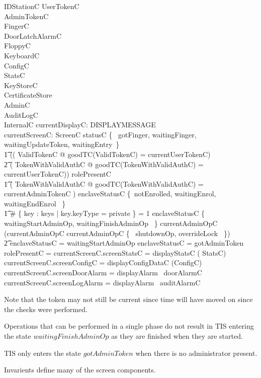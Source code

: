 \begin{schema}{IDStationC}
	UserTokenC
\\	AdminTokenC
\\	FingerC
\\	DoorLatchAlarmC
\\      FloppyC
\\      KeyboardC
\\      ConfigC
\\      StatsC
\\      KeyStoreC
\\      CertificateStore
\\      AdminC
\\      AuditLogC
\\      InternalC
\also
	currentDisplayC: DISPLAYMESSAGE
\\      currentScreenC: ScreenC
\where
	statusC \in \{~ gotFinger, waitingFinger, waitingUpdateToken, waitingEntry~\} \implies
\\ \t1		 (( \exists ValidTokenC @ 
			goodTC(\theta ValidTokenC) = currentUserTokenC)
\\ \t2  \lor ( \exists TokenWithValidAuthC @ 
			goodTC(\theta TokenWithValidAuthC) = currentUserTokenC))
\also
        rolePresentC \neq \Nil \implies       
\\ \t1		 ( \exists TokenWithValidAuthC @ 
			goodTC(\theta TokenWithValidAuthC) =
 currentAdminTokenC )
\also
        enclaveStatusC \notin \{~notEnrolled, waitingEnrol, waitingEndEnrol ~\} \implies       
\\ \t1         \# \{ key : keys | key.keyType = private \} = 1
\also
        enclaveStatusC \in \{~ waitingStartAdminOp, waitingFinishAdminOp ~\} \iff currentAdminOpC \neq \Nil
\also
       (currentAdminOpC \neq \Nil \land \The currentAdminOpC \in \{~
shutdownOp, overrideLock ~\}) 
\\ \t2          \implies enclaveStatusC = waitingStartAdminOp
\also
        enclaveStatusC = gotAdminToken \implies rolePresentC = \Nil
\also   %
        currentScreenC.screenStatsC = displayStatsC (\theta
        StatsC)
\\      currentScreenC.screenConfigC = displayConfigDataC (\theta ConfigC)
\\      currentScreenC.screenDoorAlarm = displayAlarm~ doorAlarmC
\\      currentScreenC.screenLogAlarm = displayAlarm~ auditAlarmC
\end{schema}
\begin{Zcomment}
\item
Note that the token may not still be current since time will have
moved on since the checks were performed.
\item
Operations that can be performed in a single phase do not result in
TIS entering the state $waitingFinishAdminOp$ as they are finished
when they are started. 
\item
TIS only enters the state $gotAdminToken$ when there is no
administrator present.
\item
Invarients define many of the screen components.
\end{Zcomment}

